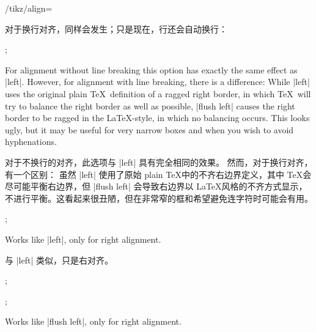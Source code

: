 \begin{key}{/tikz/align=}
\begin{description}
            对于换行对齐，同样会发生；只是现在，行还会自动换行：
\begin{codeexample}[]
\tikz {};
\end{codeexample}
        \item[|align=|\declare{\texttt{flush left}}] For alignment without line
            breaking this option has exactly the same effect as |left|.
            However, for alignment with line breaking, there is a difference:
            While |left| uses the original plain \TeX\ definition of a ragged
            right border, in which \TeX\ will try to balance the right border
            as well as possible, |flush left| causes the right border to be
            ragged in the \LaTeX-style, in which no balancing occurs. This
            looks ugly, but it may be useful for very narrow boxes and when you
            wish to avoid hyphenations.
            
            对于不换行的对齐，此选项与 |left| 具有完全相同的效果。
            然而，对于换行对齐，有一个区别：
虽然 |left| 使用了原始 plain \TeX 中的不齐右边界定义，其中 \TeX 会尽可能平衡右边界，但 |flush left| 会导致右边界以 \LaTeX 风格的不齐方式显示，不进行平衡。这看起来很丑陋，但在非常窄的框和希望避免连字符时可能会有用。
\begin{codeexample}[]
\tikz {};
\end{codeexample}
        \item[|align=|\declare{|right|}] Works like |left|, only for right
            alignment.

            与 |left| 类似，只是右对齐。
\begin{codeexample}[]
\tikz {};
\end{codeexample}
\begin{codeexample}[]
\tikz {};
\end{codeexample}
        \item[|align=|\declare{\texttt{flush right}}] Works like |flush left|,
            only for right alignment.
            

\end{description}
\end{key}
